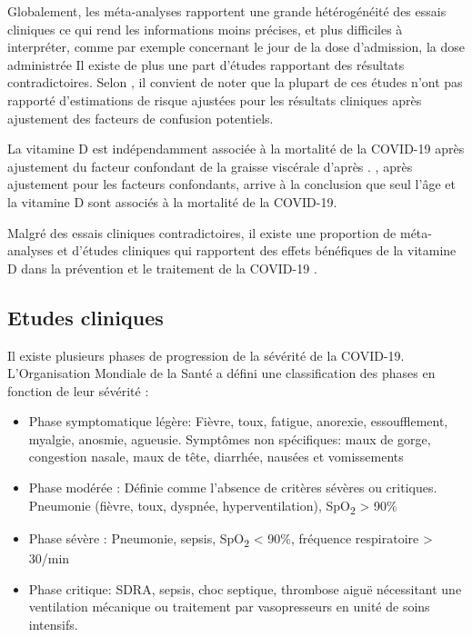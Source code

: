 \documentclass[
  a4paper,
  DIV=11,
  numbers=noendperiod,
  listof=totoc]{scrreprt}
\providecommand{\tightlist}{%
  \setlength{\itemsep}{0pt}\setlength{\parskip}{0pt}}\usepackage{longtable,booktabs,array}
\begin{document}
Globalement, les méta-analyses rapportent une grande hétérogénéité des
essais cliniques ce qui rend les informations moins précises, et plus
difficiles à interpréter, comme par exemple concernant le jour de la
dose d'admission, la dose administrée Il existe de plus une part
d'études rapportant des résultats contradictoires. Selon
\textcite{Pal.2022}, il convient de noter que la plupart de ces études
n'ont pas rapporté d'estimations de risque ajustées pour les résultats
cliniques après ajustement des facteurs de confusion potentiels.

La vitamine D est indépendamment associée à la mortalité de la COVID-19
après ajustement du facteur confondant de la graisse viscérale d'après
\textcite{Vanegas-Cedillo.2022} . \textcite{Borsche.2021}, après
ajustement pour les facteurs confondants, arrive à la conclusion que
seul l'âge et la vitamine D sont associés à la mortalité de la COVID-19.

Malgré des essais cliniques contradictoires, il existe une proportion de
méta-analyses et d'études cliniques qui rapportent des effets bénéfiques
de la vitamine D dans la prévention et le traitement de la COVID-19
\autocite{Pal.2022}.

\subsection{Etudes cliniques}\label{etudes-cliniques}

Il existe plusieurs phases de progression de la sévérité de la COVID-19.
L'Organisation Mondiale de la Santé a défini une classification des
phases en fonction de leur sévérité \autocite{WHO.2023.org,Agarwal.2020}
:

\begin{itemize}
\tightlist
\item
  Phase symptomatique légère: Fièvre, toux, fatigue, anorexie,
  essoufflement, myalgie, anosmie, agueusie. Symptômes non spécifiques:
  maux de gorge, congestion nasale, maux de tête, diarrhée, nausées et
  vomissements
\item
  Phase modérée : Définie comme l'absence de critères sévères ou
  critiques. Pneumonie (fièvre, toux, dyspnée, hyperventilation),
  SpO\textsubscript{2} \textgreater{} 90\%
\item
  Phase sévère : Pneumonie, sepsis, SpO\textsubscript{2} \textless{}
  90\%, fréquence respiratoire \textgreater{} 30/min
\item
  Phase critique: \ac{SDRA}, sepsis, choc septique, thrombose aiguë
  nécessitant une ventilation mécanique ou traitement par vasopresseurs
  en unité de soins intensifs.
\end{itemize}
\end{document}
